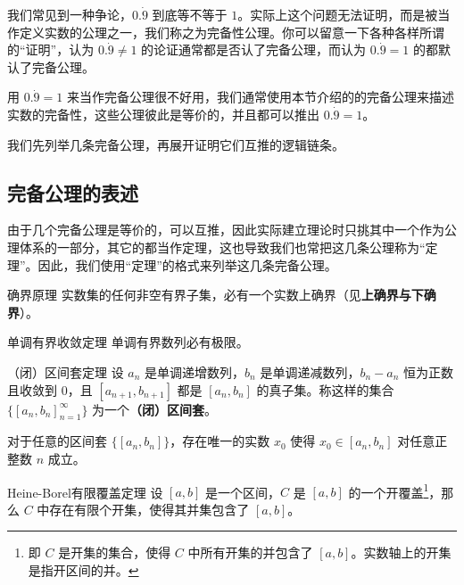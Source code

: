 


我们常见到一种争论，$0.\dot{9}$ 到底等不等于 $1$。实际上这个问题无法证明，而是被当作定义实数的公理之一，我们称之为完备性公理。你可以留意一下各种各样所谓的“证明”，认为 $0.\dot{9}\neq 1$ 的论证通常都是否认了完备公理，而认为 $0.\dot{9}=1$ 的都默认了完备公理。

用 $0.\dot{9}=1$ 来当作完备公理很不好用，我们通常使用本节介绍的的完备公理来描述实数的完备性，这些公理彼此是等价的，并且都可以推出 $0.\dot{9}=1$。

我们先列举几条完备公理，再展开证明它们互推的逻辑链条。

\subsection{完备公理的表述}

由于几个完备公理是等价的，可以互推，因此实际建立理论时只挑其中一个作为公理体系的一部分，其它的都当作定理，这也导致我们也常把这几条公理称为“定理”。因此，我们使用“定理”的格式来列举这几条完备公理。

\begin{theorem}{确界原理}\label{RCompl_the1}
实数集的任何非空有界子集，必有一个实数上确界（见\textbf{上确界与下确界}）。
\end{theorem}

\begin{theorem}{单调有界收敛定理}\label{RCompl_the2}
单调有界数列必有极限。
\end{theorem}

\begin{theorem}{（闭）区间套定理}\label{RCompl_the3}
设 $a_n$ 是单调递增数列，$b_n$ 是单调递减数列，$b_n-a_n$ 恒为正数且收敛到 $0$，且 $[a_{n+1}, b_{n+1}]$ 都是 $[a_n, b_n]$ 的真子集。称这样的集合 $\{[a_n, b_n]_{n=1}^\infty\}$ 为一个\textbf{（闭）区间套}。

对于任意的区间套 $\{[a_n, b_n]\}$，存在唯一的实数 $x_0$ 使得 $x_0\in [a_n, b_n]$ 对任意正整数 $n$ 成立。
\end{theorem}

\begin{theorem}{Heine-Borel有限覆盖定理}\label{RCompl_the4}
设 $[a, b]$ 是一个区间，$C$ 是 $[a, b]$ 的一个开覆盖\footnote{即 $C$ 是开集的集合，使得 $C$ 中所有开集的并包含了 $[a, b]$。实数轴上的开集是指开区间的并。}，那么 $C$ 中存在有限个开集，使得其并集包含了 $[a, b]$。
\end{theorem}

